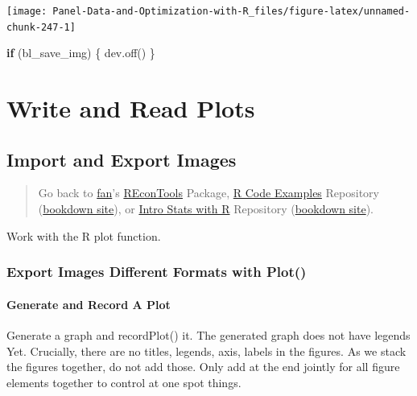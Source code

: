 \documentclass[
]{book}
\newenvironment{Shaded}{\begin{snugshade}}{\end{snugshade}}
\newcommand{\ControlFlowTok}[1]{\textcolor[rgb]{0.13,0.29,0.53}{\textbf{#1}}}
\newcommand{\FunctionTok}[1]{\textcolor[rgb]{0.00,0.00,0.00}{#1}}
\newcommand{\NormalTok}[1]{#1}
\begin{document}
\begin{center}\texttt{[image: Panel-Data-and-Optimization-with-R\_files/figure-latex/unnamed-chunk-247-1]} \end{center}

\begin{Shaded}
\begin{Highlighting}[]
\ControlFlowTok{if}\NormalTok{ (bl\_save\_img) \{}
  \FunctionTok{dev.off}\NormalTok{()}
\NormalTok{\}}
\end{Highlighting}
\end{Shaded}

\hypertarget{write-and-read-plots}{%
\section{Write and Read Plots}\label{write-and-read-plots}}

\hypertarget{import-and-export-images}{%
\subsection{Import and Export Images}\label{import-and-export-images}}

\begin{quote}
Go back to \href{http://fanwangecon.github.io/}{fan}'s \href{https://fanwangecon.github.io/REconTools/}{REconTools} Package, \href{https://fanwangecon.github.io/R4Econ/}{R Code Examples} Repository (\href{https://fanwangecon.github.io/R4Econ/bookdown}{bookdown site}), or \href{https://fanwangecon.github.io/Stat4Econ/}{Intro Stats with R} Repository (\href{https://fanwangecon.github.io/Stat4Econ/bookdown}{bookdown site}).
\end{quote}

Work with the R plot function.

\hypertarget{export-images-different-formats-with-plot}{%
\subsubsection{Export Images Different Formats with Plot()}\label{export-images-different-formats-with-plot}}

\hypertarget{generate-and-record-a-plot}{%
\paragraph{Generate and Record A Plot}\label{generate-and-record-a-plot}}

Generate a graph and recordPlot() it. The generated graph does not have legends Yet. Crucially, there are no titles, legends, axis, labels in the figures. As we stack the figures together, do not add those. Only add at the end jointly for all figure elements together to control at one spot things.
\end{document}
